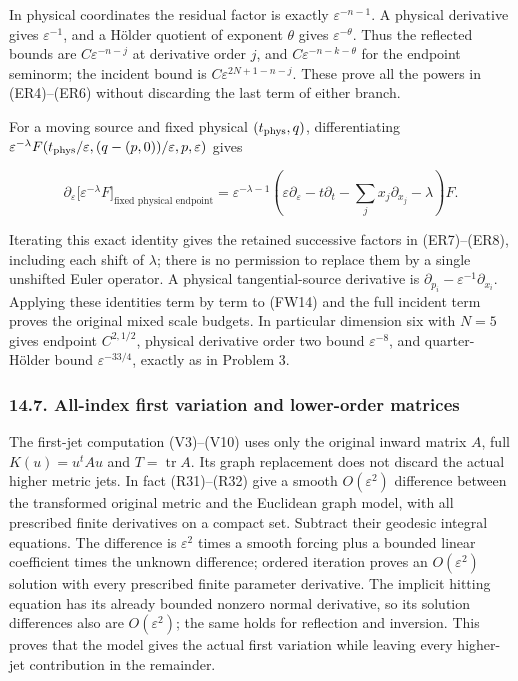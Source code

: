 \documentclass[
  11pt,
]{article}
\begin{document}
In physical coordinates the residual factor is exactly
\(\varepsilon^{-n-1}\). A physical derivative gives
\(\varepsilon^{-1}\), and a Hölder quotient of exponent \(\theta\) gives
\(\varepsilon^{-\theta}\). Thus the reflected bounds are
\(C\varepsilon^{-n-j}\) at derivative order \(j\), and
\(C\varepsilon^{-n-k-\theta}\) for the endpoint seminorm; the incident
bound is \(C\varepsilon^{2N+1-n-j}\). These prove all the powers in
(ER4)--(ER6) without discarding the last term of either branch.

For a moving source and fixed physical \((t_{\rm phys},q)\),
differentiating
\(\varepsilon^{-\lambda}F(t_{\rm phys}/\varepsilon,(q-(p,0))/\varepsilon,p,\varepsilon)\)
gives

\[
 \partial_\varepsilon\bigl[\varepsilon^{-\lambda}F\bigr]_{
                   \text{fixed physical endpoint}}
 =\varepsilon^{-\lambda-1}
     (\varepsilon\partial_\varepsilon-t\partial_t
                -\sum_jx_j\partial_{x_j}-\lambda)F .\tag{FW15}
\]

Iterating this exact identity gives the retained successive factors in
(ER7)--(ER8), including each shift of \(\lambda\); there is no
permission to replace them by a single unshifted Euler operator. A
physical tangential-source derivative is
\(\partial_{p_i}-\varepsilon^{-1}\partial_{x_i}\). Applying these
identities term by term to (FW14) and the full incident term proves the
original mixed scale budgets. In particular dimension six with \(N=5\)
gives endpoint \(C^{2,1/2}\), physical derivative order two bound
\(\varepsilon^{-8}\), and quarter-Hölder bound \(\varepsilon^{-33/4}\),
exactly as in Problem 3.

\subsubsection{14.7. All-index first variation and lower-order
matrices}\label{all-index-first-variation-and-lower-order-matrices}

The first-jet computation (V3)--(V10) uses only the original inward
matrix \(A\), full \(K(u)=u^tAu\) and \(T=\operatorname{tr}A\). Its
graph replacement does not discard the actual higher metric jets. In
fact (R31)--(R32) give a smooth \(O(\varepsilon^2)\) difference between
the transformed original metric and the Euclidean graph model, with all
prescribed finite derivatives on a compact set. Subtract their geodesic
integral equations. The difference is \(\varepsilon^2\) times a smooth
forcing plus a bounded linear coefficient times the unknown difference;
ordered iteration proves an \(O(\varepsilon^2)\) solution with every
prescribed finite parameter derivative. The implicit hitting equation
has its already bounded nonzero normal derivative, so its solution
differences also are \(O(\varepsilon^2)\); the same holds for reflection
and inversion. This proves that the model gives the actual first
variation while leaving every higher-jet contribution in the remainder.
\end{document}
